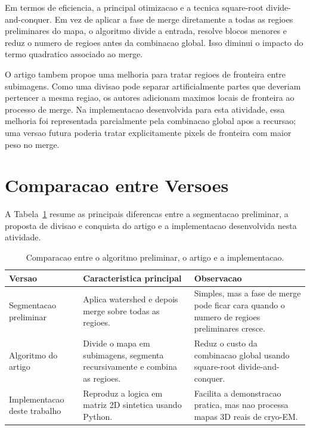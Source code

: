 \documentclass[tcc1]{uftex}
\begin{document}
Em termos de eficiencia, a principal otimizacao e a tecnica square-root divide-and-conquer. Em vez de aplicar a fase de merge diretamente a todas as regioes preliminares do mapa, o algoritmo divide a entrada, resolve blocos menores e reduz o numero de regioes antes da combinacao global. Isso diminui o impacto do termo quadratico associado ao merge.

O artigo tambem propoe uma melhoria para tratar regioes de fronteira entre subimagens. Como uma divisao pode separar artificialmente partes que deveriam pertencer a mesma regiao, os autores adicionam maximos locais de fronteira ao processo de merge. Na implementacao desenvolvida para esta atividade, essa melhoria foi representada parcialmente pela combinacao global apos a recursao; uma versao futura poderia tratar explicitamente pixels de fronteira com maior peso no merge.

\section{Comparacao entre Versoes}

A Tabela~\ref{tab:comparacao-versoes} resume as principais diferencas entre a segmentacao preliminar, a proposta de divisao e conquista do artigo e a implementacao desenvolvida nesta atividade.

\begin{table}[H]
\centering
\caption{Comparacao entre o algoritmo preliminar, o artigo e a implementacao.}
\label{tab:comparacao-versoes}
\begin{tabular}{p{}p{}p{}}
\toprule
\textbf{Versao} & \textbf{Caracteristica principal} & \textbf{Observacao} \\
\midrule
Segmentacao preliminar & Aplica watershed e depois merge sobre todas as regioes. & Simples, mas a fase de merge pode ficar cara quando o numero de regioes preliminares cresce. \\
\midrule
Algoritmo do artigo & Divide o mapa em subimagens, segmenta recursivamente e combina as regioes. & Reduz o custo da combinacao global usando square-root divide-and-conquer. \\
\midrule
Implementacao deste trabalho & Reproduz a logica em matriz 2D sintetica usando Python. & Facilita a demonstracao pratica, mas nao processa mapas 3D reais de cryo-EM. \\
\bottomrule
\end{tabular}
\end{table}
\end{document}
